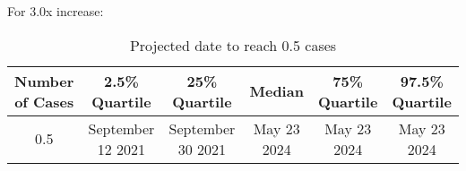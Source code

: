 For 3.0x increase:

\begin{table}[h] 
 \centering 
 \begin{tabular}{c|c|c|c|c|c}
Number of Cases & 2.5\% Quartile & 25\% Quartile & Median & 75\% Quartile & 97.5\% Quartile \\
\hline
0.5 & September 12 2021 & September 30 2021 & May 23 2024 & May 23 2024 & May 23 2024\\
\end{tabular}
\caption{Projected date to reach 0.5 cases}
\label{tab:BP_date_to_reach_cases}
\end{table}
